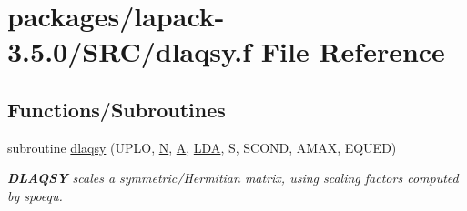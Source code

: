 \hypertarget{dlaqsy_8f}{}\section{packages/lapack-\/3.5.0/\+S\+R\+C/dlaqsy.f File Reference}
\label{dlaqsy_8f}
\subsection*{Functions/\+Subroutines}
\begin{DoxyCompactItemize}
\item 
subroutine \hyperlink{group__doubleSYauxiliary_gaf752e7a2738ba60307c9d41d171099b0}{dlaqsy} (U\+P\+L\+O, \hyperlink{polmisc_8c_a0240ac851181b84ac374872dc5434ee4}{N}, \hyperlink{classA}{A}, \hyperlink{example__user_8c_ae946da542ce0db94dced19b2ecefd1aa}{L\+D\+A}, S, S\+C\+O\+N\+D, A\+M\+A\+X, E\+Q\+U\+E\+D)
\begin{DoxyCompactList}\small\item\em {\bfseries D\+L\+A\+Q\+S\+Y} scales a symmetric/\+Hermitian matrix, using scaling factors computed by spoequ. \end{DoxyCompactList}\end{DoxyCompactItemize}
